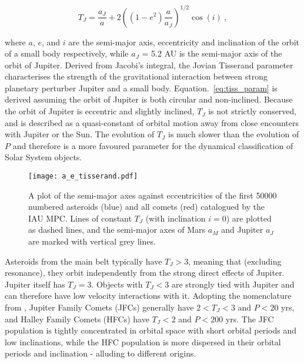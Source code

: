 \vspace{-2ex}
\begin{equation}
    T_J = \dfrac{a_J}{a} + 2\left( {(1-e^2)\dfrac{a}{a_J}} \right)^{1/2} \cos(i)~,
\label{eq:tiss_param}
\end{equation}

where $a$, $e$, and $i$ are the semi-major axis, eccentricity and inclination of the orbit of a small body respectively, while $a_J$ = 5.2 AU is the semi-major axis of the orbit of Jupiter. Derived from Jacobi's integral, the Jovian Tisserand parameter characterises the strength of the gravitational interaction between strong planetary perturber Jupiter and a small body. Equation.~\eqref{eq:tiss_param} is derived assuming the orbit of Jupiter is both circular and non-inclined. Because the orbit of Jupiter is eccentric and slightly inclined, $T_J$ is not strictly conserved, and is described as a quasi-constant of orbital motion away from close encounters with Jupiter or the Sun. The evolution of $T_J$ is much slower than the evolution of $P$ and therefore is a more favoured parameter for the dynamical classification of Solar System objects. 

\begin{figure}[t!]
    \centering
    \vspace{-3ex}
    \texttt{[image: a\_e\_tisserand.pdf]}
    \caption[Tisserand parameter plot]{A plot of the semi-major axes against eccentricities of the first 50000 numbered asteroids (blue) and all comets (red) catalogued by the IAU MPC. Lines of constant $T_J$ (with inclination $i=0$) are plotted as dashed lines, and the semi-major axes of Mars $a_M$ and Jupiter $a_J$ are marked with vertical grey lines.}
    \label{fig:tiss_param}
\end{figure}

Asteroids from the main belt typically have $T_J > 3$, meaning that (excluding resonance), they orbit independently from the strong direct effects of Jupiter. Jupiter itself has  $T_J = 3$. Objects with  $T_J < 3$ are strongly tied with Jupiter and can therefore have low velocity interactions with it. Adopting the nomenclature from \citep{1987PAICz..67...21C}, Jupiter Family Comets (JFCs) generally have $2 < T_J < 3$ and $P < 20$ yrs, and Halley Family Comets (HFCs) have $T_J < 2$ and $P < 200$ yrs. The JFC population is tightly concentrated in orbital space with short orbital periods and low inclinations, while the HFC population is more dispersed in their orbital periods and inclination - alluding to different origins.

